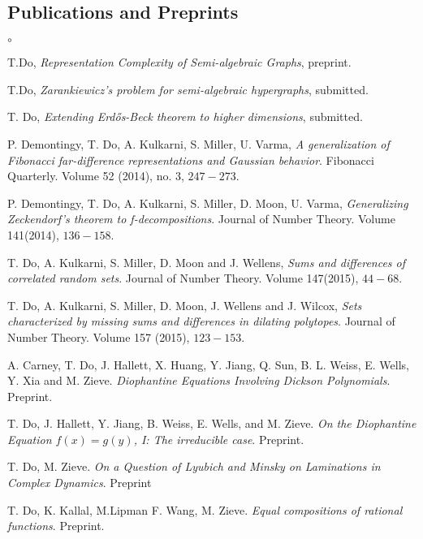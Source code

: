 \documentclass[margin,line]{res}
\newenvironment{list2}{
  \begin{list}{$\circ$}{%
      \setlength{\itemsep}{0in}
      \setlength{\parsep}{0in} \setlength{\parskip}{0in}
      \setlength{\topsep}{0in} \setlength{\partopsep}{0in}
      \setlength{\leftmargin}{0.2in}}}{\end{list}}
\begin{document}
\begin{resume}
\section{\sc Publications and Preprints}
\begin{list2}
\item[] T.Do, \textit{Representation Complexity of Semi-algebraic Graphs}, preprint.
\item[] T.Do, \textit{Zarankiewicz's problem for semi-algebraic hypergraphs}, submitted.
\item[] T. Do, \textit{Extending Erd\H{o}s-Beck theorem to higher dimensions}, submitted.
\item[] 
P. Demontingy, T. Do, A. Kulkarni, S. Miller, U. Varma, \textit{A generalization of Fibonacci far-difference representations and Gaussian behavior}. Fibonacci Quarterly. Volume 52 (2014), no. 3, $247-273$.
\item[]
P. Demontingy, T. Do, A. Kulkarni, S. Miller, D. Moon, U. Varma, \textit{Generalizing Zeckendorf's theorem to f-decompositions}. Journal of Number Theory. Volume 141(2014), $136-158$.
\item[]
T. Do, A. Kulkarni, S. Miller, D. Moon and J. Wellens, \textit{Sums and differences of correlated random sets}.{ Journal of Number Theory}. Volume 147(2015), $44-68$.
\item[]
T. Do, A. Kulkarni, S. Miller, D. Moon, J. Wellens and J. Wilcox, \textit{Sets characterized by missing sums and differences in dilating polytopes}. {Journal of Number Theory}. Volume 157 (2015), $123-153$.

\item[]
A.	Carney, T. Do, J. Hallett, X. Huang, Y. Jiang, Q. Sun, B. L. Weiss, E. Wells, Y. Xia and M. Zieve. \textit{Diophantine Equations Involving Dickson Polynomials}. Preprint.
\item[]
T. Do, J. Hallett, Y. Jiang, B. Weiss, E. Wells,  and M. Zieve. \textit{On the Diophantine Equation $f(x)=g(y)$, I: The irreducible case}. Preprint.
\item[]
T. Do, M. Zieve. \textit{On a Question of Lyubich and Minsky on Laminations in Complex Dynamics}. Preprint
\item[]
T. Do, K. Kallal, M.Lipman F. Wang, M. Zieve. \textit{Equal compositions of rational functions}. Preprint.




\end{list2}
\end{resume}
\end{document}
